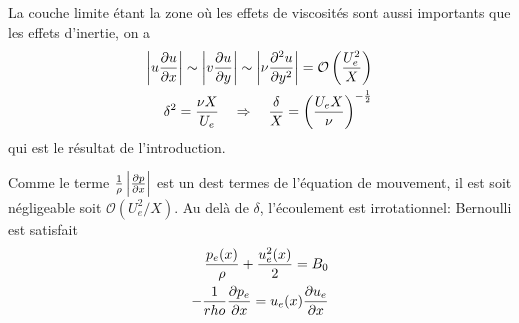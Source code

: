       La couche limite étant la zone où les effets de viscosités sont aussi importants que les effets d'inertie, on a
      \begin{equation}
        \begin{aligned}
          \left|u\pdv{u}{x}\right| \sim \left|v \pdv{u}{y} \right| \sim \left|\nu \pdv[2]{u}{y} \right| = \mathcal{O}\left(\frac{U_e^2}{X}\right)\\
          \delta^2 = \frac{\nu X}{U_e} \quad \Rightarrow \quad \frac{\delta}{X} = \left(\frac{U_e X}{\nu}\right)^{-\frac{1}{2}}
        \end{aligned}
      \end{equation}
      qui est le résultat de l'introduction.

      Comme le terme $\frac{1}{\rho} \left|\pdv{p}{x}\right|$ est un dest termes de l'équation de mouvement, il est soit négligeable soit $\mathcal{O}(U_e^2/X)$. Au delà de $\delta$, l'écoulement est irrotationnel: Bernoulli est satisfait
      \begin{equation}
        \begin{aligned}
          \frac{p_e(x)}{\rho} + \frac{u_e^2(x)}{2} = B_0\\
          -\frac{1}{rho} \pdv{p_e}{x}(x) = u_e(x) \pdv{u_e}{x}(x)
        \end{aligned}
      \end{equation}

